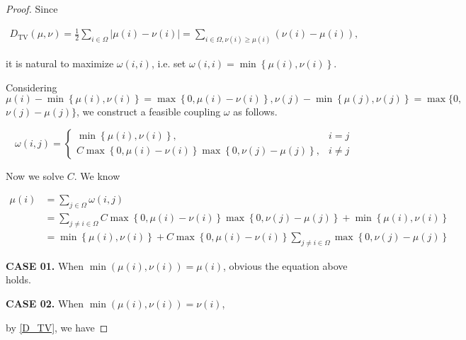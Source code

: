 \documentclass{article}
\begin{document}
\begin{proof}
Since

\vspace{-2em}
\begin{align}
    D_{\mathrm{TV}}\left(\mu,\nu\right)=\frac{1}{2}\sum_{i\in\Omega}\left|\mu(i)-\nu(i)\right|=\sum_{i\in\Omega,\nu(i)\geq\mu(i)}\left(\nu(i)-\mu(i)\right),\label{D_TV}
\end{align}

\vspace{-0.5em} \hspace{1.3em}
it is natural to maximize $\omega(i,i)$, i.e. set $\omega(i,i)=\min\left\{\mu(i),\nu(i)\right\}$.

\hspace{1.3em}
Considering $\mu(i)-\min\left\{\mu(i),\nu(i)\right\}=\max\left\{0,\mu(i)-\nu(i)\right\}, \nu(j)-\min\left\{\mu(j),\nu(j)\right\}=\max\{0,$ $\nu(j)-\mu(j)\}$, we construct a feasible coupling $\omega$ as follows.

$$\omega(i,j)=\left\{
\begin{array}{ll}
    \min\left\{\mu(i),\nu(i)\right\}, & i=j \\
    C\max\left\{0,\mu(i)-\nu(i)\right\}\max\left\{0,\nu(j)-\mu(j)\right\}, & i\neq j
\end{array}\right.$$

\vspace{3em} \hspace{1.3em}
Now we solve $C$. We know

\vspace{-2.5em}
\begin{align*}
    \mu(i) &= \sum_{j\in\Omega}\omega(i,j) \\
    &= \sum_{j\neq i\in\Omega}C\max\left\{0,\mu(i)-\nu(i)\right\}\max\left\{0,\nu(j)-\mu(j)\right\} + \min\left\{\mu(i),\nu(i)\right\} \\
    &= \min\left\{\mu(i),\nu(i)\right\} + C\max\left\{0,\mu(i)-\nu(i)\right\}\sum_{j\neq i\in\Omega}\max\left\{0,\nu(j)-\mu(j)\right\}
\end{align*}

\vspace{-1em} \hspace{3.9em}
\textbf{CASE 01.} When $\min\left(\mu(i),\nu(i)\right)=\mu(i)$, obvious the equation above holds.

\hspace{3.9em}
\textbf{CASE 02.} When $\min\left(\mu(i),\nu(i)\right)=\nu(i)$, 

\hspace{3.9em}
by \eqref{D_TV}, we have


\end{proof}
\end{document}
